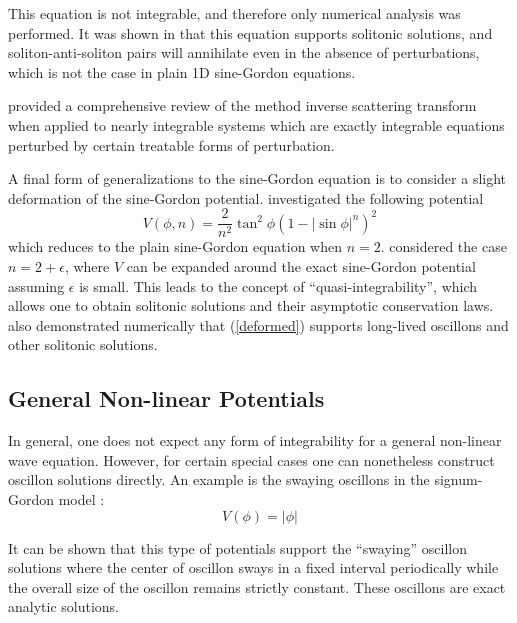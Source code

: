 \documentclass{report}
\begin{document}
This equation is not integrable, and therefore only numerical analysis was performed. It was shown in \cite{PhysRevB.85.134525} that this equation supports solitonic solutions, and soliton-anti-soliton pairs will annihilate even in the absence of perturbations, which is not the case in plain 1D sine-Gordon equations.

\cite{RevModPhys.61.763} provided a comprehensive review of the method inverse scattering transform when applied to nearly integrable systems which are exactly integrable equations perturbed by certain treatable forms of perturbation.

\medbreak

A final form of generalizations to the sine-Gordon equation is to consider a slight deformation of the sine-Gordon potential. \cite{Ferreira2011} investigated the following potential
\begin{equation}\label{deformed}
  V(\phi, n) = \frac{2}{n^2} \tan^2 \phi \left( 1 - \left|\sin\phi\right|^n \right)^2
\end{equation}
which reduces to the plain sine-Gordon equation when $n=2$. \cite{Ferreira2011} considered the case $n=2+\epsilon$, where $V$ can be expanded around the exact sine-Gordon potential assuming $\epsilon$ is small. This leads to the concept of ``quasi-integrability'', which allows one to obtain solitonic solutions and their asymptotic conservation laws. \cite{Ferreira2011} also demonstrated numerically that (\ref{deformed}) supports long-lived oscillons and other solitonic solutions.

\subsection{General Non-linear Potentials}
In general, one does not expect any form of integrability for a general non-linear wave equation. However, for certain special cases one can nonetheless construct oscillon solutions directly. An example is the swaying oscillons in the signum-Gordon model \cite{Arodz:2011zm}:
\begin{equation}
  V(\phi)=\left|\phi\right|
\end{equation}

It can be shown \cite{Arodz:2011zm} that this type of potentials support the ``swaying'' oscillon solutions where the center of oscillon sways in a fixed interval periodically while the overall size of the oscillon remains strictly constant. These oscillons are exact analytic solutions.

\medbreak
\end{document}
